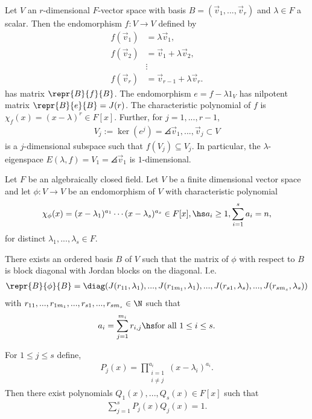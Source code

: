 \documentclass{article}
\begin{document}
\begin{lemma}
	Let $V$ an $r$-dimensional $F$-vector space with basis $B=(\vec v_1,...,\vec v_r)$ and
	$\lambda\in F$ a scalar. Then the endomorphism $f:V\to V$ defined by
	\begin{align*}
		f(\vec v_1) & =\lambda \vec v_1,              \\
		f(\vec v_2) & =\vec v_1+\lambda \vec v_2,     \\
		            & \vdots                          \\
		f(\vec v_r) & =\vec v_{r-1}+\lambda \vec v_r.
	\end{align*}
	has matrix $\repr{B}{f}{B}$. The endomorphism $e=f-\lambda 1_V$ has nilpotent matrix
	$\repr{B}{e}{B}=J(r)$. The characteristic polynomial of $f$ is $\chi_f(x)=(x-\lambda)^r\in F[x]$.
	Further, for $j=1,...,r-1$,
	\begin{align*}
		V_j := \ker(e^j)=\angles{\vec v_1,...,\vec v_j}\subset V
	\end{align*}
	is a $j$-dimensional subspace such that $f(V_j)\subseteq V_j$. In particular, the $\lambda$-eigenspace
	$E(\lambda, f)=V_1=\angles{\vec v_1}$ is $1$-dimensional.
\end{lemma}

Let $F$ be an algebraically closed field. Let $V$ be a finite dimensional vector space and let
$\phi:V\to V$ be an endomorphism of $V$ with characteristic polynomial
\begin{align*}
	\chi_\phi(x)=(x-\lambda_1)^{a_1}\cdots (x-\lambda_s)^{a_s}\in F[x], \hs a_i\geq 1,\sum_{i=1}^s a_i=n,
\end{align*}
for distinct $\lambda_1,...,\lambda_s\in F$.

\begin{theorem}
	There exists an ordered basis $B$ of $V$ such that
	the matrix of $\phi$ with respect to $B$ is block diagonal with Jordan blocks on the diagonal. I.e.
	\begin{align*}
		\repr{B}{\phi}{B}=\diag(J(r_{11},\lambda_1),...,J(r_{1m_1},\lambda_1),...,J(r_{s1},\lambda_s),...,J(r_{sm_s},\lambda_s))
	\end{align*}
	with $r_{11},...,r_{1m_1},...,r_{s1},...,r_{sm_s}\in\N$ such that
	\begin{align*}
		a_i=\sum_{j=1}^{m_i} r_{i,j} \hs\text{for all }1\leq i\leq s.
	\end{align*}
\end{theorem}

\begin{lemma}[Lemma 6.3.1]
	For $1\leq j\leq s$ define,
	\begin{align*}
		P_j(x)=\prod_{\substack{i=1 \\ i\neq j}}^{a_i}(x-\lambda_i)^{a_i}.
	\end{align*}
	Then there exist polynomials $Q_1(x),...,Q_s(x)\in F[x]$ such that
	\begin{align*}
		\sum_{j=1}^s P_j(x)Q_j(x)=1.
	\end{align*}
\end{lemma}
\end{document}
